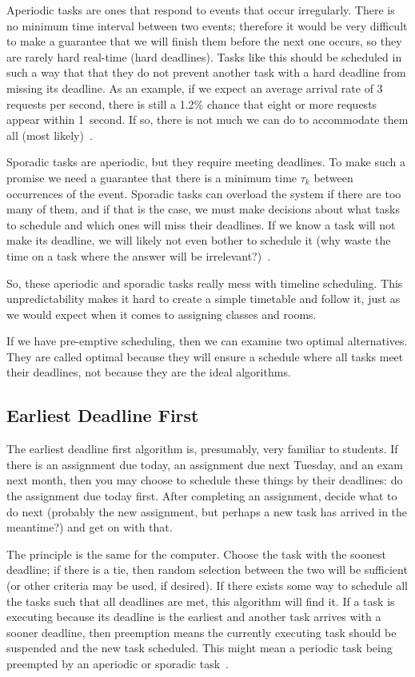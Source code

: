 Aperiodic tasks are ones that respond to events that occur irregularly. There is no minimum time interval between two events; therefore it would be very difficult to make a guarantee that we will finish them before the next one occurs, so they are rarely hard real-time (hard deadlines). Tasks like this should be scheduled in such a way that that they do not prevent another task with a hard deadline from missing its deadline. As an example, if we expect an average arrival rate of 3 requests per second, there is still a 1.2\% chance that eight or more requests appear within 1~second. If so, there is not much we can do to accommodate them all (most likely)~\cite{mte241}.

Sporadic tasks are aperiodic, but they require meeting deadlines. To make such a promise we need a guarantee that there is a minimum time $\tau_{k}$ between occurrences of the event. Sporadic tasks can overload the system if there are too many of them, and if that is the case, we must make decisions about what tasks to schedule and which ones will miss their deadlines. If we know a task will not make its deadline, we will likely not even bother to schedule it (why waste the time on a task where the answer will be irrelevant?)~\cite{mte241}.

So, these aperiodic and sporadic tasks really mess with timeline scheduling. This unpredictability makes it hard to create a simple timetable and follow it, just as we would expect when it comes to assigning classes and rooms. 

If we have pre-emptive scheduling, then we can examine two optimal alternatives. They are called optimal because they will ensure a schedule where all tasks meet their deadlines, not because they are the ideal algorithms.

\subsection*{Earliest Deadline First}

The earliest deadline first algorithm is, presumably, very familiar to students. If there is an assignment due today, an assignment due next Tuesday, and an exam next month, then you may choose to schedule these things by their deadlines: do the assignment due today first. After completing an assignment, decide what to do next (probably the new assignment, but perhaps a new task has arrived in the meantime?) and get on with that.

The principle is the same for the computer. Choose the task with the soonest deadline; if there is a tie, then random selection between the two will be sufficient (or other criteria may be used, if desired). If there exists some way to schedule all the tasks such that all deadlines are met, this algorithm will find it. If a task is executing because its deadline is the earliest and another task arrives with a sooner deadline, then preemption means the currently executing task should be suspended and the new task scheduled. This might mean a periodic task being preempted by an aperiodic or sporadic task~\cite{mte241}.

